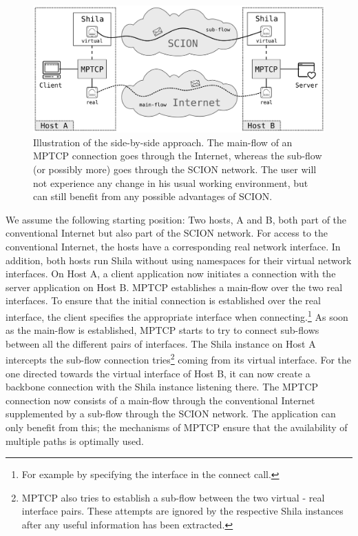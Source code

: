 \begin{figure}[H]
	\begin{center}
		\def\svgwidth{1\textwidth}
		\includegraphics[scale=0.24]{../illustrations/futureWork/SideBySide.pdf}   
		\caption[Caption for the list of figures.]{Illustration of the side-by-side approach. The main-flow of an MPTCP connection goes through the Internet, whereas the sub-flow (or possibly more) goes through the SCION network. The user will not experience any change in his usual working environment, but can still benefit from any possible advantages of SCION.}
		\label{fig:SideBySide}
	\end{center}
\end{figure}

We assume the following starting position: Two hosts, A and B, both part of the conventional Internet but also part of the SCION network. For access to the conventional Internet, the hosts have a corresponding real network interface.  In addition, both hosts run Shila without using namespaces for their virtual network interfaces. On Host A, a client application now initiates a connection with the server application on Host B. MPTCP establishes a main-flow over the two real interfaces. To ensure that the initial connection is established over the real interface, the client specifies the appropriate interface when connecting.\footnote{For example by specifying the interface in the connect call.} As soon as the main-flow is established, MPTCP starts to try to connect sub-flows between all the different pairs of interfaces. The Shila instance on Host A intercepts the sub-flow connection tries\footnote{MPTCP also tries to establish a sub-flow between the two virtual - real interface pairs. These attempts are ignored by the respective Shila instances after any useful information has been extracted.} coming from its virtual interface. For the one directed towards the virtual interface of Host B, it can now create a backbone connection with the Shila instance listening there. The MPTCP connection now consists of a  main-flow through the conventional Internet supplemented by a sub-flow through the SCION network. The application can only benefit from this; the mechanisms of MPTCP ensure that the availability of multiple paths is optimally used.  